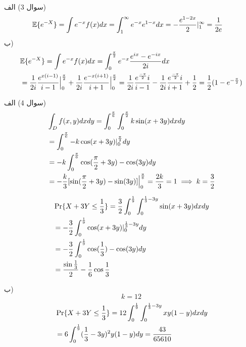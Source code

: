 \documentclass[10pt,letterpaper]{report}
\begin{document}
سوال 3) الف) 
\begin{equation}
\begin{split}
&\mathbb{E}\{e^{-X}\}=\int e^{-x}f(x)dx=\int_1^\infty e^{-x}e^{1-x}dx
=-{e^{1-2x}\over 2}|_1^\infty={1\over 2e}
\end{split}
\end{equation}
ب)
\begin{equation}
\begin{split}
&\mathbb{E}\{e^{-X}\}=\int e^{-x}f(x)dx=\int_0^{\pi\over 2} e^{-x}{e^{ix}-e^{-ix}\over 2i}dx
\\&=
{1\over 2i}{e^{x(i-1)}\over i-1}\Big|_0^{\pi \over 2}+{1\over 2i}{e^{-x(i+1)}\over i+1}\Big|_0^{\pi \over 2}={1\over 2i}{e^{-\pi\over 2}i\over i-1}-{1\over 2i}{e^{-\pi\over 2}i\over i+1}+{1\over 2}={1\over 2}(1-e^{-{\pi\over 2}})
\end{split}
\end{equation}

سوال 4) الف)
\begin{equation}
\begin{split}
&\int_D f(x,y)dxdy=\int_0^{\pi\over 6}\int_0^{\pi\over 2}k\sin (x+3y)dxdy
\\&=\int_0^{\pi\over 6}-k\cos (x+3y)|_{0}^{\pi\over 2}dy
\\&=-k\int_0^{\pi\over 6}\cos ({\pi\over 2}+3y)-\cos (3y)dy
\\&=-{k\over 3}[\sin ({\pi\over 2}+3y)-\sin (3y)]\Big|_0^{\pi\over 6}={2k\over 3}=1
\implies k={3\over 2}
\end{split}
\end{equation}

\begin{equation}
\begin{split}
&\Pr\{X+3Y\le {1\over 3}\}={3\over 2}\int_0^{1\over 9}\int_0^{{1\over 3}-3y}\sin (x+3y)dxdy
\\&=-{3\over 2}\int_0^{1\over 9}\cos (x+3y)|_{0}^{{1\over 3}-3y}dy
\\&=-{3\over 2}\int_0^{1\over 9}\cos ({1\over 3})-\cos (3y)dy
\\&={\sin {1\over 3}\over 2}-{1\over6}\cos{1\over 3}
\end{split}
\end{equation}

ب)
$$
k=12
$$
\begin{equation}
\begin{split}
&\Pr\{X+3Y\le {1\over 3}\}=12\int_0^{1\over 9}\int_0^{{1\over 3}-3y}xy(1-y)dxdy
\\&=6\int_0^{1\over 9}({1\over3}-3y)^2y(1-y)dy={43\over 65610}
\end{split}
\end{equation}
\end{document}
